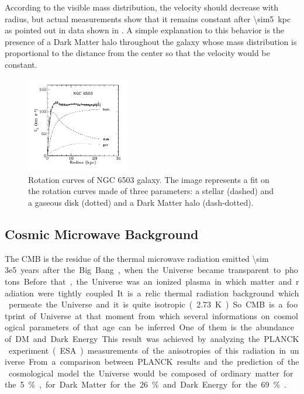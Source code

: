 According to the visible mass distribution, the velocity should decrease with radius, but actual measurements show that it remains constant after \SI{\sim5}{kpc} as pointed out in data shown in \Fig{\ref{fig:rotation}}. A simple explanation to this behavior is the presence of a Dark Matter halo throughout the galaxy whose mass distribution is proportional to the distance from the center so that the velocity would be constant.
\begin{figure}[pt]
\centering
\includegraphics[width=0.4\textwidth]{DarkMatter/Rotationcurves}
\caption{Rotation curves of NGC 6503 galaxy. The image represents a fit on the rotation curves made of three parameters: a stellar (dashed) and a gaseous disk (dotted) and a Dark Matter halo (dash-dotted).}
\label{fig:rotation}
\end{figure}


\subsection{Cosmic Microwave Background}
The CMB is the residue of the thermal microwave radiation emitted \SI{\sim 3e5} years after the Big Bang, when the Universe became transparent to photons. Before that, the Universe was an ionized plasma in which matter and radiation were tightly coupled. It is a relic thermal radiation background which permeate the Universe and it is quite isotropic (\SI{2.73}{\K}). So CMB is a footprint of Universe at that moment from which several informations on cosmological parameters of that age can be inferred. One of them is the abundance of DM and Dark Energy. This result was achieved by analyzing the PLANCK experiment (ESA) measurements of the anisotropies of this radiation in universe. From a comparison between PLANCK results and the prediction of the cosmological model the Universe would be composed of ordinary matter for the 5\%, for Dark Matter for the 26\% and Dark Energy for the 69\% \cite{Planck:results}.

